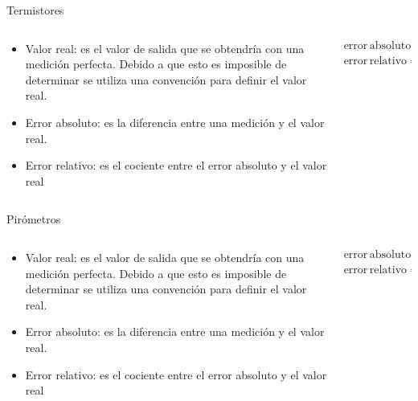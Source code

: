 \documentclass[aspectratio=169]{beamer}
\begin{document}
\begin{frame}{Termistores}
    \begin{columns}[c, onlytextwidth]
        \begin{column}{0.55\textwidth}
            \begin{itemize}
                \item Valor real: es el valor de salida que se obtendría con una medición perfecta. Debido a que esto es imposible de determinar se utiliza una convención para definir el valor real.  
                \item Error absoluto: es la diferencia entre una medición y el valor real. 
                \item Error relativo: es el cociente entre el error absoluto y el valor real
            \end{itemize}
        \end{column}
        \begin{column}{0.40\textwidth}
            \begin{equation*}
                \mathrm{error\,absoluto} = \mathrm{medición} - \mathrm{valor\,real}
            \end{equation*}
            \begin{equation*}
                \mathrm{error\,relativo} = \dfrac{\mathrm{error\,absoluto}}{\mathrm{valor\,real}}
            \end{equation*}
        \end{column}
    \end{columns}
\end{frame}

\begin{frame}{Pirómetros}
    \begin{columns}[c, onlytextwidth]
        \begin{column}{0.55\textwidth}
            \begin{itemize}
                \item Valor real: es el valor de salida que se obtendría con una medición perfecta. Debido a que esto es imposible de determinar se utiliza una convención para definir el valor real.  
                \item Error absoluto: es la diferencia entre una medición y el valor real. 
                \item Error relativo: es el cociente entre el error absoluto y el valor real
            \end{itemize}
        \end{column}
        \begin{column}{0.40\textwidth}
            \begin{equation*}
                \mathrm{error\,absoluto} = \mathrm{medición} - \mathrm{valor\,real}
            \end{equation*}
            \begin{equation*}
                \mathrm{error\,relativo} = \dfrac{\mathrm{error\,absoluto}}{\mathrm{valor\,real}}
            \end{equation*}
        \end{column}
    \end{columns}
\end{frame}
\end{document}
